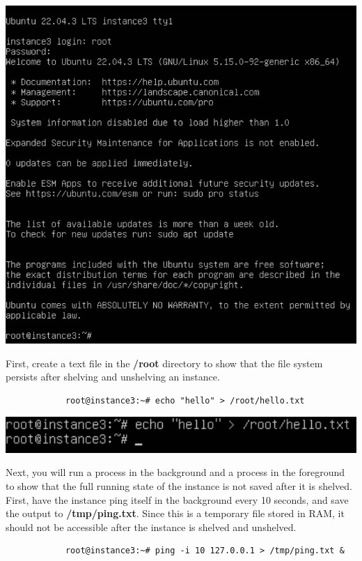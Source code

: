 \documentclass[letterpaper, 12pt]{article}
\begin{document}
\begin{enumerate}
\begin{labstep}
        \begin{center}
            \includegraphics[width=\linewidth]{images/part5/step5.png}
        \end{center}
    \end{labstep}

    \begin{labstep}
        First, create a text file in the \textbf{/root} directory to show that the file system persists after shelving and unshelving an instance.
        \begin{lstlisting}
            root@instance3:~# echo "hello" > /root/hello.txt
        \end{lstlisting}

        \begin{center}
            \includegraphics[width=\linewidth]{images/part5/step6.png}
        \end{center}
    \end{labstep}

    \begin{labstep}
        Next, you will run a process in the background and a process in the foreground to show that the full running state of the instance is not saved after it is shelved.
        First, have the instance ping itself in the background every 10 seconds, and save the output to \textbf{/tmp/ping.txt}.
        Since this is a temporary file stored in RAM, it should not be accessible after the instance is shelved and unshelved.
        \begin{lstlisting}
            root@instance3:~# ping -i 10 127.0.0.1 > /tmp/ping.txt &
        \end{lstlisting}


\end{labstep}
\end{enumerate}
\end{document}
